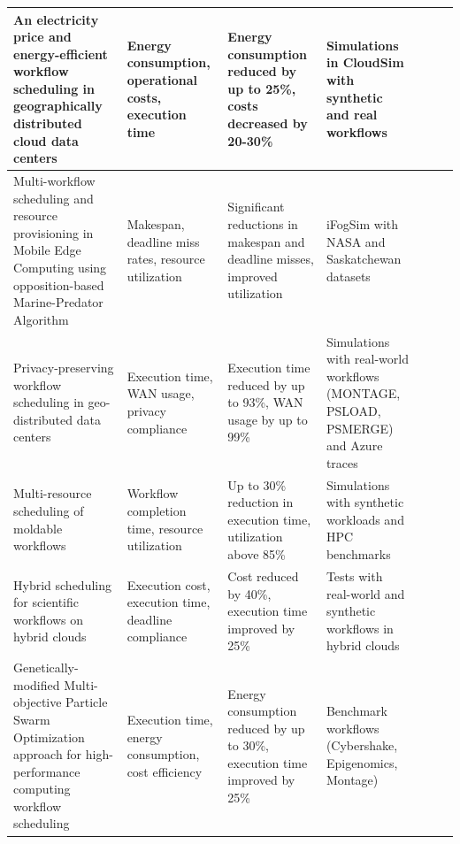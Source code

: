 \documentclass[a4paper, final]{article}
\begin{document}
\begin{table}[H]
\begin{tabularx}{\textwidth}{|p{3.5cm}|X|X|X|X|X|X|}
    An electricity price and energy-efficient workflow scheduling in geographically distributed cloud data centers \cite{bib:5_epee} &
    Energy consumption, operational costs, execution time &
    Energy consumption reduced by up to 25\%, costs decreased by 20-30\% &
    Simulations in CloudSim with synthetic and real workflows \\
    \hline

    Multi-workflow scheduling and resource provisioning in Mobile Edge Computing using opposition-based Marine-Predator Algorithm \cite{bib:6_marine} &
    Makespan, deadline miss rates, resource utilization &
    Significant reductions in makespan and deadline misses, improved utilization &
    iFogSim with NASA and Saskatchewan datasets \\
    \hline

    Privacy-preserving workflow scheduling in geo-distributed data centers \cite{bib:7_ppps} &
    Execution time, WAN usage, privacy compliance &
    Execution time reduced by up to 93\%, WAN usage by up to 99\% &
    Simulations with real-world workflows (MONTAGE, PSLOAD, PSMERGE) and Azure traces \\
    \hline

    Multi-resource scheduling of moldable workflows \cite{bib:8} &
    Workflow completion time, resource utilization &
    Up to 30\% reduction in execution time, utilization above 85\% &
    Simulations with synthetic workloads and HPC benchmarks \\
    \hline

    Hybrid scheduling for scientific workflows on hybrid clouds \cite{bib:9} &
    Execution cost, execution time, deadline compliance &
    Cost reduced by 40\%, execution time improved by 25\% &
    Tests with real-world and synthetic workflows in hybrid clouds \\
    \hline

    Genetically-modified Multi-objective Particle Swarm Optimization
    approach for high-performance computing workflow scheduling \cite{bib:10} &
    Execution time, energy consumption, cost efficiency &
    Energy consumption reduced by up to 30\%, execution time improved by 25\% &
    Benchmark workflows (Cybershake, Epigenomics, Montage) \\
    \hline
    \end{tabularx}
\end{table}
\end{document}
